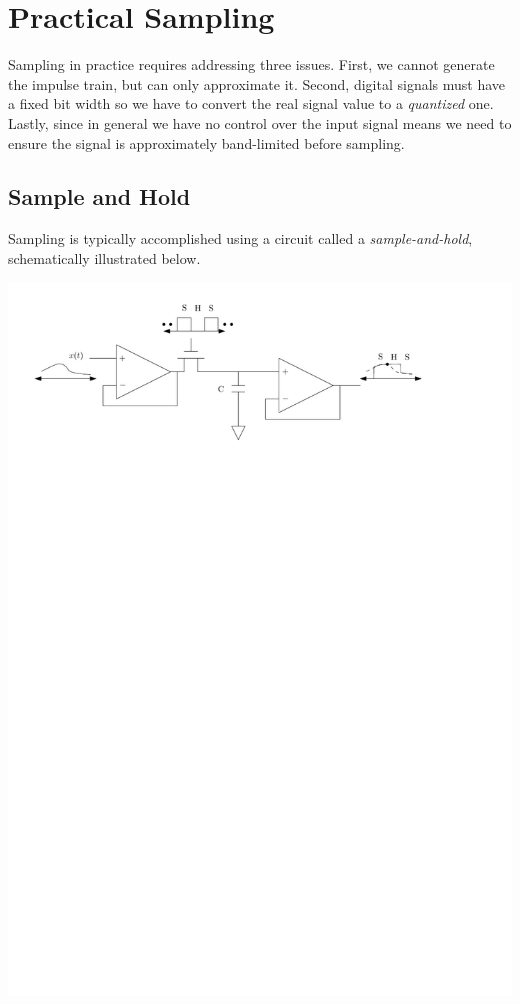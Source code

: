\section{Practical Sampling}

Sampling in practice requires addressing three issues. First, we cannot generate the impulse train, but can only approximate it. Second, digital signals must have a fixed bit width so we have to convert the real signal value to a \emph{quantized} one. Lastly, since in general we have no control over the input signal means we need to ensure the signal is approximately band-limited before sampling.

\subsection{Sample and Hold}
Sampling is typically accomplished using a circuit called a \emph{sample-and-hold}, schematically illustrated below.

\begin{center}
  \includegraphics[scale=0.8]{graphics/smaple_hold.pdf}
\end{center}


